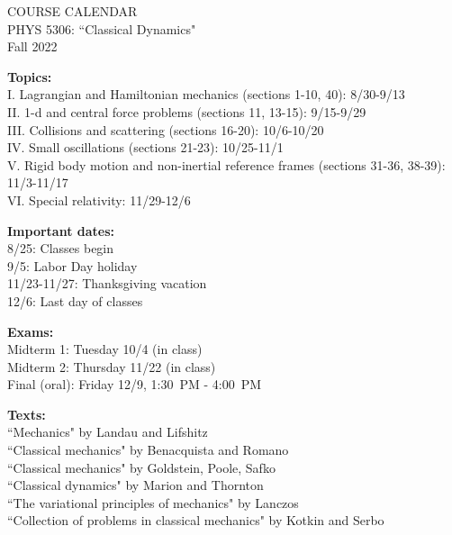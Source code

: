 \documentclass[11pt]{NSF}
\begin{document}
\begin{center}
COURSE CALENDAR\\
PHYS 5306: ``Classical Dynamics"\\
Fall 2022\\
\end{center}

{\bf Topics:}\\
I. Lagrangian and Hamiltonian mechanics (sections 1-10,  40):
8/30-9/13\\
II. 1-d and central force problems (sections 11, 13-15): 9/15-9/29\\
III. Collisions and scattering (sections 16-20): 10/6-10/20\\
IV. Small oscillations (sections 21-23): 10/25-11/1\\
V. Rigid body motion and non-inertial reference frames (sections
31-36, 38-39): 11/3-11/17\\
VI. Special relativity: 11/29-12/6

{\bf Important dates:}\\
8/25: Classes begin\\
9/5: Labor Day holiday\\
11/23-11/27: Thanksgiving vacation\\
12/6: Last day of classes

{\bf Exams:}\\
Midterm 1: Tuesday 10/4 (in class)\\
Midterm 2: Thursday 11/22 (in class)\\
Final (oral): Friday 12/9, 1:30~PM - 4:00~PM

{\bf Texts:}\\
``Mechanics" by Landau and Lifshitz\\
``Classical mechanics" by Benacquista and Romano\\
``Classical mechanics" by Goldstein, Poole, Safko\\
``Classical dynamics" by Marion and Thornton\\
``The variational principles of mechanics" by Lanczos\\
``Collection of problems in classical mechanics" by Kotkin and Serbo\\
\end{document}
